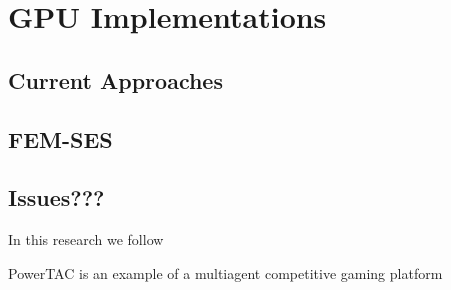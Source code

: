 \clearpage
\chapter{GPU Implementations}

\section{Current Approaches}
\section{FEM-SES}
\section{Issues???}


In this research we follow %


PowerTAC is an example of a multiagent competitive gaming platform %